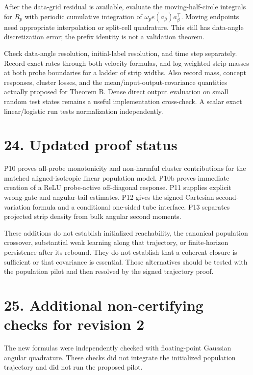 \documentclass[
  10pt,
]{article}
\begin{document}
After the data-grid residual is available, evaluate the
moving-half-circle integrals for \(R_p\) with periodic cumulative
integration of \(\omega_p e(a_\beta)a_\beta^\top\). Moving endpoints
need appropriate interpolation or split-cell quadrature. This still has
data-angle discretization error; the prefix identity is not a validation
theorem.

Check data-angle resolution, initial-label resolution, and time step
separately. Record exact rates through both velocity formulas, and log
weighted strip masses at both probe boundaries for a ladder of strip
widths. Also record mass, concept responses, cluster losses, and the
mean/input-output-covariance quantities actually proposed for Theorem B.
Dense direct output evaluation on small random test states remains a
useful implementation cross-check. A scalar exact linear/logistic run
tests normalization independently.

\section{24. Updated proof status}\label{updated-proof-status}

P10 proves all-probe monotonicity and non-harmful cluster contributions
for the matched aligned-isotropic linear population model. P10b proves
immediate creation of a ReLU probe-active off-diagonal response. P11
supplies explicit wrong-gate and angular-tail estimates. P12 gives the
signed Cartesian second-variation formula and a conditional one-sided
tube interface. P13 separates projected strip density from bulk angular
second moments.

These additions do not establish initialized reachability, the canonical
population crossover, substantial weak learning along that trajectory,
or finite-horizon persistence after its rebound. They do not establish
that a coherent closure is sufficient or that covariance is essential.
Those alternatives should be tested with the population pilot and then
resolved by the signed trajectory proof.

\section{25. Additional non-certifying checks for revision
2}\label{additional-non-certifying-checks-for-revision-2}

The new formulas were independently checked with floating-point Gaussian
angular quadrature. These checks did not integrate the initialized
population trajectory and did not run the proposed pilot.
\end{document}
